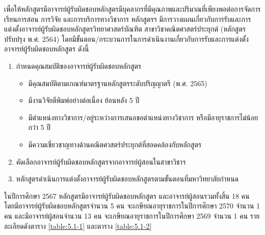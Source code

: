 \newpage
{}

เพื่อให้หลักสูตรมีอาจารย์ผู้รับผิดชอบหลักสูตรมีบุคลากรที่มีคุณภาพและปริมาณที่เพียงพอต่อการจัดการเรียนการสอน การวิจัย และการบริการทางวิชาการ หลักสูตรฯ มีการวางแผนเกี่ยวกับการรับและการแต่งตั้งอาจารย์ผู้รับผิดชอบหลักสูตรวิทยาศาสตร์บัณฑิต สาขาวิชาคณิตศาสตร์ประยุกต์ (หลักสูตรปรับปรุง พ.ศ. 2564) โดยมีขั้นตอน/กระบวนการในการดำเนินงานเกี่ยวกับการรับและการแต่งตั้งอาจารย์ผู้รับผิดชอบหลักสูตร ดังนี้
\begin{enumerate} 
\item กำหนดคุณสมบัติของอาจารย์ผู้รับผิดชอบหลักสูตร 
\begin{itemize} 
\item มีคุณสมบัติตามเกณฑ์มาตรฐานหลักสูตรระดับปริญญาตรี (พ.ศ. 2565)   
\item มีงานวิจัยตีพิมพ์อย่างต่อเนื่อง ย้อนหลัง 5 ปี 
\item มีตำแหน่งทางวิชาการ/อยู่ระหว่างการเสนอขอตำแหน่งทางวิชาการ หรือมีอายุราชการไม่น้อยกว่า 5 ปี  
\item มีความเชี่ยวชาญทางด้านคณิตศาสตร์ประยุกต์ที่สอดคล้องกับหลักสูตร 
\end{itemize} 
\item คัดเลือกอาจารย์ผู้รับผิดชอบหลักสูตรจากอาจารย์ผู้สอนในสาขาวิชาฯ 
\item หลักสูตรดำเนินการแต่งตั้งอาจารย์ผู้รับผิดชอบหลักสูตรตามขั้นตอนที่มหาวิทยาลัยกำหนด 
\end{enumerate}

 ในปีการศึกษา 2567 หลักสูตรมีอาจารย์ผู้รับผิดชอบหลักสูตร และอาจารย์ผู้สอนรวมทั้งสิ้น 18 คน โดยมีอาจารย์ผู้รับผิดชอบหลักสูตรจำนวน 5 คน จะเกษียณอายุราชการในปีการศึกษา 2570 จำนวน 1 คน และมีอาจารย์ผู้สอนจำนวน 13 คน จะเกษียณอายุราชการในปีการศึกษา 2569  จำนวน 1 คน รายละเอียดดังตาราง \ref{table:5.1-1}  และตาราง \ref{table:5.1-2}
 
